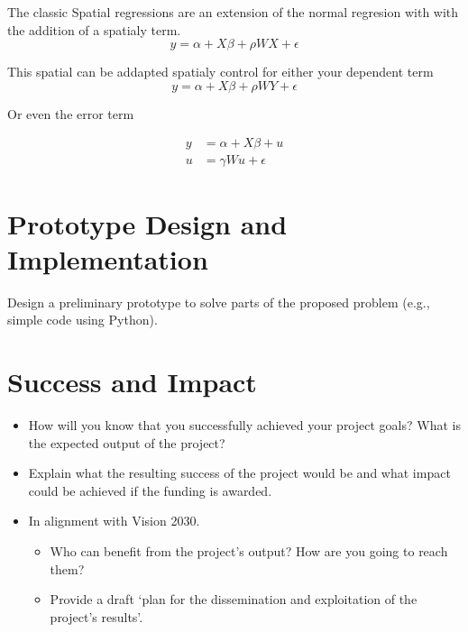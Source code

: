 \documentclass{article}
\begin{document}
The classic Spatial regressions are an extension of the normal regresion with with the addition of a spatialy term.
\begin{equation}
	y = \alpha + X \beta + \rho W X + \epsilon
	\label{eq:SDM}
\end{equation}

This spatial can be addapted spatialy control for either your dependent term
\begin{equation}
	y = \alpha + X \beta + \rho W Y + \epsilon
	\label{eq:SAR}
\end{equation}

Or even the error term

\begin{equation}
	\begin{split}
		y & =\alpha + X \beta + u  \\
		u & =\gamma W u + \epsilon
	\end{split}
	\label{eq:SEM}
\end{equation}

\section{Prototype Design and Implementation}
Design a preliminary prototype to solve parts of the proposed problem (e.g., simple code using Python).

\section{Success and Impact}
\begin{itemize}
	\item How will you know that you successfully achieved your project goals? What is the expected output of the project?
	\item Explain what the resulting success of the project would be and what impact could be achieved if the funding is awarded.
	\item In alignment with Vision 2030.
	      \begin{itemize}
		      \item Who can benefit from the project's output? How are you going to reach them?
		      \item Provide a draft ‘plan for the dissemination and exploitation of the project's results’.
	      \end{itemize}
\end{itemize}





\end{document}
